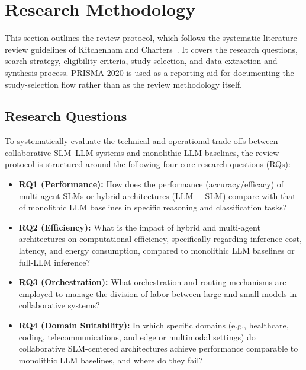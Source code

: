 \section{Research Methodology}
\label{sec:methodology}
This section outlines the review protocol, which follows the systematic literature review guidelines of Kitchenham and Charters~\cite{kitchenham2007guidelines}. It covers the research questions, search strategy, eligibility criteria, study selection, and data extraction and synthesis process. PRISMA 2020 is used as a reporting aid for documenting the study-selection flow rather than as the review methodology itself.

\subsection{Research Questions}
\label{sec:research_questions}

To systematically evaluate the technical and operational trade-offs between collaborative SLM--LLM systems and monolithic LLM baselines, the review protocol is structured around the following four core research questions (RQs):

\begin{itemize}
    \item \textbf{RQ1 (Performance):} How does the performance (accuracy/efficacy) of multi-agent SLMs or hybrid architectures (LLM + SLM) compare with that of monolithic LLM baselines in specific reasoning and classification tasks?
    
    \item \textbf{RQ2 (Efficiency):} What is the impact of hybrid and multi-agent architectures on computational efficiency, specifically regarding inference cost, latency, and energy consumption, compared to monolithic LLM baselines or full-LLM inference?
    
    \item \textbf{RQ3 (Orchestration):} What orchestration and routing mechanisms are employed to manage the division of labor between large and small models in collaborative systems?
    
    \item \textbf{RQ4 (Domain Suitability):} In which specific domains (e.g., healthcare, coding, telecommunications, and edge or multimodal settings) do collaborative SLM-centered architectures achieve performance comparable to monolithic LLM baselines, and where do they fail?
\end{itemize}

